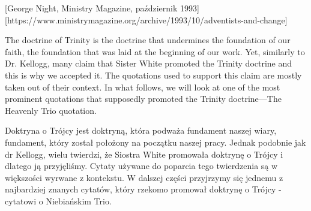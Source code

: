 [George Night, Ministry Magazine, październik 1993][https://www.ministrymagazine.org/archive/1993/10/adventists-and-change]


The doctrine of Trinity is the doctrine that undermines the foundation of our faith, the foundation that was laid at the beginning of our work. Yet, similarly to Dr. Kellogg, many claim that Sister White promoted the Trinity doctrine and this is why we accepted it. The quotations used to support this claim are mostly taken out of their context. In what follows, we will look at one of the most prominent quotations that supposedly promoted the Trinity doctrine—The Heavenly Trio quotation.


Doktryna o Trójcy jest doktryną, która podważa fundament naszej wiary, fundament, który został położony na początku naszej pracy. Jednak podobnie jak dr Kellogg, wielu twierdzi, że Siostra White promowała doktrynę o Trójcy i dlatego ją przyjęliśmy. Cytaty używane do poparcia tego twierdzenia są w większości wyrwane z kontekstu. W dalszej części przyjrzymy się jednemu z najbardziej znanych cytatów, który rzekomo promował doktrynę o Trójcy - cytatowi o Niebiańskim Trio.




% 